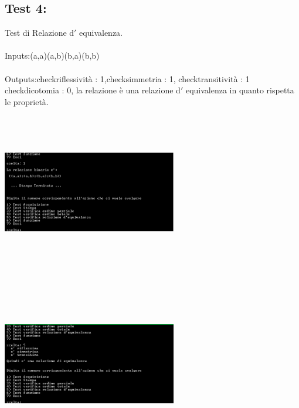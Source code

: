 \documentclass[11pt, a4paper, titlepage, block]{article}
\begin{document}
	\subsection{Test 4:}
	Test di Relazione d$'$ equivalenza.\\
	\\
	Inputs:(a,a)(a,b)(b,a)(b,b)\\
	\\
	Outputs:checkriflessivit\`a : 1,checksimmetria : 1, checktransitivit\`a : 1
	checkdicotomia : 0, la relazione \`e una relazione d$'$ equivalenza in quanto rispetta le propriet\`a.\\
	\includegraphics[width=3in,height=3in,viewport=0 0 300 300]{../Screenshots/Test4Input.png}
	\\
	\includegraphics[width=3in,height=3in,viewport=0 0 300 300]{../Screenshots/Test4Output.png}
	\\
	\\
	\newpage
\end{document}
